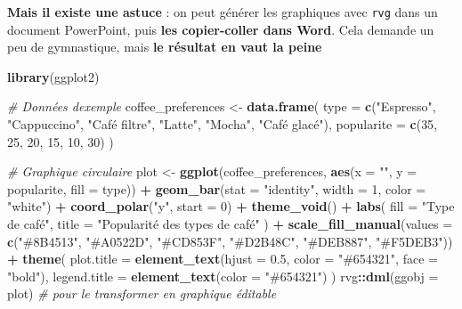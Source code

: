 \documentclass[
]{article}
\newenvironment{Shaded}{\begin{snugshade}}{\end{snugshade}}
\newcommand{\AttributeTok}[1]{\textcolor[rgb]{0.13,0.29,0.53}{#1}}
\newcommand{\CommentTok}[1]{\textcolor[rgb]{0.56,0.35,0.01}{\textit{#1}}}
\newcommand{\DecValTok}[1]{\textcolor[rgb]{0.00,0.00,0.81}{#1}}
\newcommand{\FloatTok}[1]{\textcolor[rgb]{0.00,0.00,0.81}{#1}}
\newcommand{\FunctionTok}[1]{\textcolor[rgb]{0.13,0.29,0.53}{\textbf{#1}}}
\newcommand{\NormalTok}[1]{#1}
\newcommand{\OtherTok}[1]{\textcolor[rgb]{0.56,0.35,0.01}{#1}}
\newcommand{\SpecialCharTok}[1]{\textcolor[rgb]{0.81,0.36,0.00}{\textbf{#1}}}
\newcommand{\StringTok}[1]{\textcolor[rgb]{0.31,0.60,0.02}{#1}}
\begin{document}
\textbf{Mais il existe une astuce} : on peut générer les graphiques avec
\texttt{rvg} dans un document PowerPoint, puis \textbf{les copier-coller
dans Word}. Cela demande un peu de gymnastique, mais \textbf{le résultat
en vaut la peine}

\begin{Shaded}
\begin{Highlighting}[]
\FunctionTok{library}\NormalTok{(ggplot2)}

\CommentTok{\# Données d\textquotesingle{}exemple}
\NormalTok{coffee\_preferences }\OtherTok{\textless{}{-}} \FunctionTok{data.frame}\NormalTok{(}
  \AttributeTok{type =} \FunctionTok{c}\NormalTok{(}\StringTok{"Espresso"}\NormalTok{, }\StringTok{"Cappuccino"}\NormalTok{, }\StringTok{"Café filtre"}\NormalTok{, }\StringTok{"Latte"}\NormalTok{, }\StringTok{"Mocha"}\NormalTok{, }\StringTok{"Café glacé"}\NormalTok{),}
  \AttributeTok{popularite =} \FunctionTok{c}\NormalTok{(}\DecValTok{35}\NormalTok{, }\DecValTok{25}\NormalTok{, }\DecValTok{20}\NormalTok{, }\DecValTok{15}\NormalTok{, }\DecValTok{10}\NormalTok{, }\DecValTok{30}\NormalTok{)}
\NormalTok{)}

\CommentTok{\# Graphique circulaire}
\NormalTok{plot }\OtherTok{\textless{}{-}} \FunctionTok{ggplot}\NormalTok{(coffee\_preferences, }\FunctionTok{aes}\NormalTok{(}\AttributeTok{x =} \StringTok{""}\NormalTok{, }\AttributeTok{y =}\NormalTok{ popularite, }\AttributeTok{fill =}\NormalTok{ type)) }\SpecialCharTok{+}
  \FunctionTok{geom\_bar}\NormalTok{(}\AttributeTok{stat =} \StringTok{"identity"}\NormalTok{, }\AttributeTok{width =} \DecValTok{1}\NormalTok{, }\AttributeTok{color =} \StringTok{"white"}\NormalTok{) }\SpecialCharTok{+}
  \FunctionTok{coord\_polar}\NormalTok{(}\StringTok{"y"}\NormalTok{, }\AttributeTok{start =} \DecValTok{0}\NormalTok{) }\SpecialCharTok{+}
  \FunctionTok{theme\_void}\NormalTok{() }\SpecialCharTok{+}
  \FunctionTok{labs}\NormalTok{(}
    \AttributeTok{fill =} \StringTok{"Type de café"}\NormalTok{,}
    \AttributeTok{title =} \StringTok{"Popularité des types de café"}
\NormalTok{  ) }\SpecialCharTok{+}
  \FunctionTok{scale\_fill\_manual}\NormalTok{(}\AttributeTok{values =} \FunctionTok{c}\NormalTok{(}\StringTok{"\#8B4513"}\NormalTok{, }\StringTok{"\#A0522D"}\NormalTok{, }\StringTok{"\#CD853F"}\NormalTok{, }\StringTok{"\#D2B48C"}\NormalTok{, }\StringTok{"\#DEB887"}\NormalTok{, }\StringTok{"\#F5DEB3"}\NormalTok{)) }\SpecialCharTok{+}
  \FunctionTok{theme}\NormalTok{(}
    \AttributeTok{plot.title =} \FunctionTok{element\_text}\NormalTok{(}\AttributeTok{hjust =} \FloatTok{0.5}\NormalTok{, }\AttributeTok{color =} \StringTok{"\#654321"}\NormalTok{, }\AttributeTok{face =} \StringTok{"bold"}\NormalTok{),}
    \AttributeTok{legend.title =} \FunctionTok{element\_text}\NormalTok{(}\AttributeTok{color =} \StringTok{"\#654321"}\NormalTok{)}
\NormalTok{  )}
\NormalTok{rvg}\SpecialCharTok{::}\FunctionTok{dml}\NormalTok{(}\AttributeTok{ggobj =}\NormalTok{ plot) }\CommentTok{\# pour le transformer en graphique éditable}
\end{Highlighting}
\end{Shaded}
\end{document}
